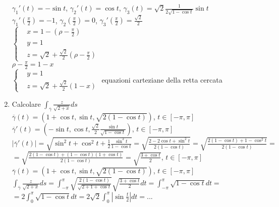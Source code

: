 \begin{exbar}
\begin{example}
\begin{enumerate}
		$\gamma_1'(t)=-\sin t$, $\gamma_2'(t)=\cos t$, $\gamma_3(t)=\sqrt{2} \frac{1}{2\sqrt{1-\cos t}}\sin t$\\
		$\gamma_1'\left(\frac{\pi}{2}\right)=-1$, $\gamma_2\left( \frac{\pi}{2}\right)=0$, $\gamma_3'\left( \frac{\pi}{2}\right)=\frac{\sqrt{2}}{2}$\\
		$\begin{cases}
			& x= 1-\left(\rho-\frac{\pi}{2}\right)\\
			& y= 1\\
			& z= \sqrt{2} +\frac{\sqrt{2}}{2}\left(\rho -\frac{\pi}{2}\right)
		\end{cases}$\\
		$\rho-\frac{\pi}{2}=1-x$\\
		$\begin{cases}
			& y=1\\
			& z= \sqrt{2} +\frac{\sqrt{2}}{2}(1-x)
		\end{cases}$
		equazioni carteziane della retta cercata
		\item Calcolare $\int_{\overline{\gamma}} \frac{z}{\sqrt{2+x}}ds$\\
		$\overline{\gamma}(t)=\left( 1+\cos t, \sin t, \sqrt{2(1-\cos t)} \right)$, $t \in [-\pi,\pi]$\\
		$\overline{\gamma}'(t)=\left( -\sin t , \cos t , \frac{\sqrt{2}}{2}\frac{\sin t }{\sqrt{1-\cos t}}\right)$, $t \in [-\pi,\pi]$\\
		$|\overline{\gamma}'(t)|=\sqrt{\sin^2t+\cos^2t+\frac{1}{2}\frac{\sin^2 t}{1-\cos t}}=\sqrt{\frac{2-2\cos t + \sin^2 t}{2(1-\cos t)}}=\sqrt{\frac{2(1-\cos t)+1-\cos^2t}{2(1-\cos t)}}=$\\$=\sqrt{\frac{2(1-\cos t)+ (1-\cos t)(1+\cos t)}{2(1-\cos t)}}=\sqrt{\frac{3+\cos t}{2}}$, $ t \in [-\pi,\pi]$\\
		$\overline{\gamma}(t)=\left(1+\cos t, \sin t , \sqrt{2(1-\cos t)}\right)$, $t \in [-\pi,\pi]$\\
		$\int_{\overline{\gamma}} \frac{z}{\sqrt{2+x}}ds=\int_{-\pi}^\pi \sqrt{\frac{2(1-\cos t)}{\sqrt{2+1+\cos t}}}\sqrt{\frac{3+\cos t}{2}}dt= \int_{-\pi}^\pi \sqrt{1-\cos t}dt=$\\
		$=2 \int_0^\pi \sqrt{1-\cos t}dt= 2 \sqrt{2}\int_0^\pi|\sin \frac{t}{2}|dt=...$
	\end{enumerate}
\end{example}
\end{exbar}



